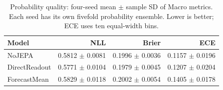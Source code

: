 \begin{table}[t]
\centering
\small
\caption{Probability quality: four-seed mean $\pm$ sample SD of Macro metrics. Each seed has its own fivefold probability ensemble. Lower is better; ECE uses ten equal-width bins.}
\label{tab:calibration}
\begin{tabular}{lrrr}
\toprule
Model & NLL & Brier & ECE \\
\midrule
NoJEPA & 0.5812 $\pm$ 0.0081 & 0.1996 $\pm$ 0.0036 & 0.1157 $\pm$ 0.0196 \\
DirectReadout & 0.5771 $\pm$ 0.0104 & 0.1979 $\pm$ 0.0045 & 0.1207 $\pm$ 0.0204 \\
ForecastMean & 0.5829 $\pm$ 0.0118 & 0.2002 $\pm$ 0.0054 & 0.1405 $\pm$ 0.0178 \\
\bottomrule
\end{tabular}
\end{table}
